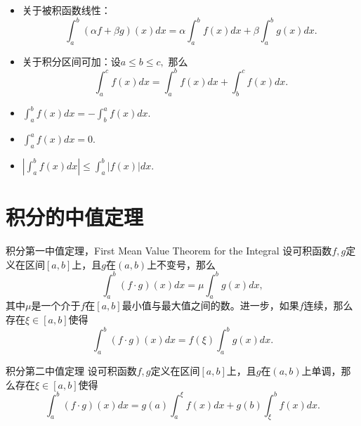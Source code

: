 \begin{frame}

\begin{itemize}
\item 关于被积函数线性：
$$\int_a^b (\alpha f + \beta g)(x)dx = \alpha \int_a^b f(x) dx + \beta \int_a^b g(x) dx.$$
\item 关于积分区间可加：设$a \leqslant b \leqslant c,$ 那么
$$\int_a^c f(x) dx = \int_a^b f(x) dx + \int_b^c f(x) dx.$$
\item \(\displaystyle \int_a^b f(x) dx = -\int_b^a f(x) dx.\)
\item \(\displaystyle \int_a^a f(x) dx = 0.\)
\item \(\displaystyle \left|\int_a^b f(x) dx\right| \leqslant \int_a^b |f(x)| dx.\)
\end{itemize}

\end{frame}


\section{积分的中值定理}


\begin{frame}

\begin{block}{积分第一中值定理，First Mean Value Theorem for the Integral}
设可积函数$f,g$定义在区间$[a,b]$上，且$g$在$(a,b)$上不变号，那么
$$\int_a^b (f\cdot g)(x)dx = \mu\int_a^b g(x)dx,$$
其中$\mu$是一个介于$f$在$[a,b]$最小值与最大值之间的数。进一步，如果$f$连续，那么存在$\xi \in [a,b]$使得
$$\int_a^b (f\cdot g)(x)dx = f(\xi)\int_a^b g(x)dx.$$
\end{block}

\end{frame}


\begin{frame}

\begin{block}{积分第二中值定理}
设可积函数$f,g$定义在区间$[a,b]$上，且$g$在$(a,b)$上单调，那么存在$\xi \in [a,b]$使得
$$\int_a^b (f\cdot g)(x)dx = g(a)\int_a^{\xi} f(x)dx + g(b)\int_{\xi}^b f(x)dx.$$
\end{block}

\end{frame}

